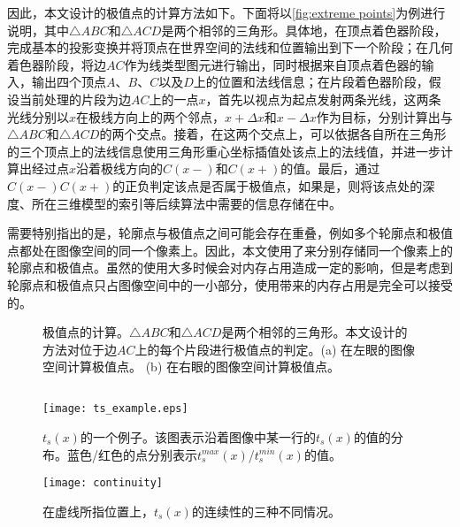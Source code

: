 {因此，本文设计的极值点的计算方法如下。下面将以\autoref{fig:extreme points}为例进行说明，其中$\triangle ABC$和$\triangle ACD$是两个相邻的三角形。具体地，在顶点着色器阶段，完成基本的投影变换并将顶点在世界空间的法线和位置输出到下一个阶段；在几何着色器阶段，将边$AC$作为线类型图元进行输出，同时根据来自顶点着色器的输入，输出四个顶点$A$、$B$、$C$以及$D$上的位置和法线信息；在片段着色器阶段，假设当前处理的片段为边$AC$上的一点$x$，首先以视点为起点发射两条光线，这两条光线分别以$x$在极线方向上的两个邻点，$x+\Delta{x}$和$x-\Delta{x}$作为目标，分别计算出与$\triangle ABC$和$\triangle ACD$的两个交点。接着，在这两个交点上，可以依据各自所在三角形的三个顶点上的法线信息使用三角形重心坐标插值处该点上的法线值，并进一步计算出经过点$x$沿着极线方向的$C(x-)$和$C(x+)$的值。最后，通过$C(x-)C(x+)$的正负判定该点是否属于极值点，如果是，则将该点处的深度、所在三维模型的索引等后续算法中需要的信息存储在\ppll{}中。

需要特别指出的是，轮廓点与极值点之间可能会存在重叠，例如多个轮廓点和极值点都处在图像空间的同一个像素上。因此，本文使用了\ppll{}来分别存储同一个像素上的轮廓点和极值点。虽然\ppll{}的使用大多时候会对内存占用造成一定的影响，但是考虑到轮廓点和极值点只占图像空间中的一小部分，使用\ppll{}带来的内存占用是完全可以接受的。

\begin{figure}[tbh]
    \centering
    \hfil
    \caption[轨迹函数的极值点的计算]{极值点的计算。$\triangle ABC$和$\triangle ACD$是两个相邻的三角形。本文设计的方法对位于边$AC$上的每个片段进行极值点的判定。(a) 在左眼的图像空间计算极值点。 (b) 在右眼的图像空间计算极值点。} \label{fig:extreme points}
\end{figure}

\subsection{\scon{}}

\begin{figure}[tbh]
    \centering
    \texttt{[image: ts\_example.eps]}
    \caption[$t_s(x)$的一个例子]{\label{fig:continuity_example}
    $t_s(x)$的一个例子。该图表示沿着图像中某一行的$t_s(x)$的值的分布。蓝色/红色的点分别表示$t_s^{max}(x)$/$t_s^{min}(x)$的值。}
\end{figure}

\begin{figure}[tbh]
    \centering
    \texttt{[image: continuity]}
    \caption[$t_s(x)$的连续性的三种不同情况]{在虚线所指位置上，$t_s(x)$的连续性的三种不同情况。}
    \label{fig:ts_continuity}
\end{figure}

}
